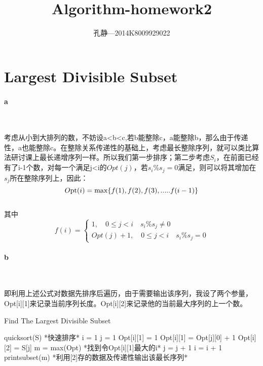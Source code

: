\documentclass{article}
\author{孔静—2014K8009929022}
\title{Algorithm-homework2}
\begin{document}
   
	\maketitle
	\tableofcontents
	\section{Largest Divisible Subset}
		\paragraph{a}\
		
			考虑从小到大排列的数，不妨设a<b<c,若b能整除c，a能整除b，那么由于传递性，a也能整除c。在整除关系传递性的基础上，考虑最长整除序列，就可以类比算法研讨课上最长递增序列一样。所以我们第一步排序；第二步考虑$S_i$，在前面已经有了i-1个数，对每一个满足j<i的$Opt(j)$，若$s_i\%s_j=0$满足，则可以将其增加在$s_j$所在整除序列上，因此：
			\\
			\[O{\rm{pt}}(i) = \max \{ f(1),f(2),f(3),.....f(i - 1){\rm{\} }}\] 
			\\其中\[f(i) = \left\{ {\begin{array}{*{20}{l}}{1,\quad 0 \le j < i\quad {s_i}\% {s_j} \ne 0}\\{Opt(j) + 1,\quad 0 \le j < i\quad {s_i}\% {s_j} = 0}\end{array}} \right.\]
			
		\paragraph{b}\
		
			即利用上述公式对数据先排序后遍历，由于需要输出该序列，我设了两个参量，Opt[i][1]来记录当前序列长度。Opt[i][2]来记录他的当前最大序列的上一个数。
		\newpage
		\begin{algorithm}
		\caption{Find The Largest Divisible Subset}
		\begin{algorithmic}
		\State quicksort(S)  *快速排序*
		\State i = 1
		\State j = 1
		\State Opt[i][1] = 1
		\State Opt[i][1] = Opt[j][0] + 1
		\State Opt[i][2] = S[j]
		\EndIf
		\EndIf
		\State m = max(Opt) *找到令Opt[i][1]最大的i*
		\State j = j + 1
		\EndFor
		\State i = i + 1
		\EndFor
		\State printsubset(m) *利用[2]存的数据及传递性输出该最长序列*
		\EndProcedure
		\end{algorithmic}
		\end{algorithm}
		
\end{document}
